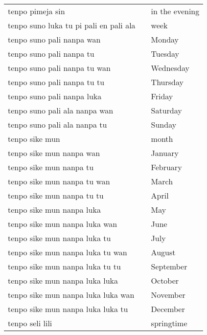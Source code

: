 \begin{supertabular}{p{5,5cm}|ll}
    tenpo pimeja sin                       &  & in the evening            \\
    tenpo suno luka tu pi pali en pali ala &  & week                      \\
    tenpo suno pali nanpa wan              &  & Monday                    \\
    tenpo suno pali nanpa tu               &  & Tuesday                   \\
    tenpo suno pali nanpa tu wan           &  & Wednesday                 \\
    tenpo suno pali nanpa tu tu            &  & Thursday                  \\
    tenpo suno pali nanpa luka             &  & Friday                    \\
    tenpo suno pali ala nanpa wan          &  & Saturday                  \\
    tenpo suno pali ala nanpa tu           &  & Sunday                    \\
    tenpo sike mun                         &  & month                     \\
    tenpo sike mun nanpa wan               &  & January                   \\
    tenpo sike mun nanpa tu                &  & February                  \\
    tenpo sike mun nanpa tu wan            &  & March                     \\
    tenpo sike mun nanpa tu tu             &  & April                     \\
    tenpo sike mun nanpa luka              &  & May                       \\
    tenpo sike mun nanpa luka wan          &  & June                      \\
    tenpo sike mun nanpa luka tu           &  & July                      \\
    tenpo sike mun nanpa luka tu wan       &  & August                    \\
    tenpo sike mun nanpa luka tu tu        &  & September                 \\
    tenpo sike mun nanpa luka luka         &  & October                   \\
    tenpo sike mun nanpa luka luka wan     &  & November                  \\
    tenpo sike mun nanpa luka luka tu      &  & December                  \\
    tenpo seli lili                        &  & springtime                \\

\end{supertabular}
